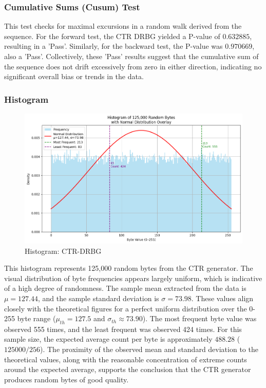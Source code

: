 \subsubsection{\textbf{Cumulative Sums (Cusum) Test}}
This test checks for maximal excursions in a random walk derived from the sequence. For the forward test, the CTR DRBG yielded a P-value of $0.632885$, resulting in a 'Pass'. Similarly, for the backward test, the P-value was $0.970669$, also a 'Pass'. Collectively, these 'Pass' results suggest that the cumulative sum of the sequence does not drift excessively from zero in either direction, indicating no significant overall bias or trends in the data.

\subsubsection{\textbf{Histogram}}


\begin{figure}[htbp] 
    \centering 
    \includegraphics[width=0.9\columnwidth]{images/Hist_CTR.png} 
    \caption{Histogram: CTR-DRBG}
    \label{fig:H:CTR}
\end{figure}

This histogram represents 125,000 random bytes from the CTR generator. The visual distribution of byte frequencies appears largely uniform, which is indicative of a high degree of randomness. The sample mean extracted from the data is $\mu = 127.44$, and the sample standard deviation is $\sigma = 73.98$. These values align closely with the theoretical figures for a perfect uniform distribution over the 0-255 byte range ($\mu_{th} = 127.5$ and $\sigma_{th} \approx 73.90$). The most frequent byte value was observed 555 times, and the least frequent was observed 424 times. For this sample size, the expected average count per byte is approximately $488.28$ ($125000 / 256$). The proximity of the observed mean and standard deviation to the theoretical values, along with the reasonable concentration of extreme counts around the expected average, supports the conclusion that the CTR generator produces random bytes of good quality.

